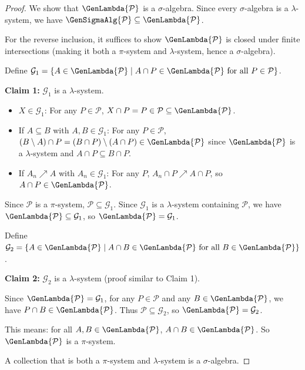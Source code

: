 \begin{proof}
We show that $\GenLambda{\mathcal{P}}$ is a $\sigma$-algebra. Since every $\sigma$-algebra is a $\lambda$-system, we have $\GenSigmaAlg{\mathcal{P}} \subseteq \GenLambda{\mathcal{P}}$.

For the reverse inclusion, it suffices to show $\GenLambda{\mathcal{P}}$ is closed under finite intersections (making it both a $\pi$-system and $\lambda$-system, hence a $\sigma$-algebra).

Define $\mathcal{G}_1 = \{A \in \GenLambda{\mathcal{P}} \mid A \cap P \in \GenLambda{\mathcal{P}} \text{ for all } P \in \mathcal{P}\}$.

\textbf{Claim 1:} $\mathcal{G}_1$ is a $\lambda$-system.
\begin{itemize}
    \item $X \in \mathcal{G}_1$: For any $P \in \mathcal{P}$, $X \cap P = P \in \mathcal{P} \subseteq \GenLambda{\mathcal{P}}$.
    \item If $A \subseteq B$ with $A, B \in \mathcal{G}_1$: For any $P \in \mathcal{P}$, $(B \setminus A) \cap P = (B \cap P) \setminus (A \cap P) \in \GenLambda{\mathcal{P}}$ since $\GenLambda{\mathcal{P}}$ is a $\lambda$-system and $A \cap P \subseteq B \cap P$.
    \item If $A_n \nearrow A$ with $A_n \in \mathcal{G}_1$: For any $P$, $A_n \cap P \nearrow A \cap P$, so $A \cap P \in \GenLambda{\mathcal{P}}$.
\end{itemize}

Since $\mathcal{P}$ is a $\pi$-system, $\mathcal{P} \subseteq \mathcal{G}_1$. Since $\mathcal{G}_1$ is a $\lambda$-system containing $\mathcal{P}$, we have $\GenLambda{\mathcal{P}} \subseteq \mathcal{G}_1$, so $\GenLambda{\mathcal{P}} = \mathcal{G}_1$.

Define $\mathcal{G}_2 = \{A \in \GenLambda{\mathcal{P}} \mid A \cap B \in \GenLambda{\mathcal{P}} \text{ for all } B \in \GenLambda{\mathcal{P}}\}$.

\textbf{Claim 2:} $\mathcal{G}_2$ is a $\lambda$-system (proof similar to Claim 1).

Since $\GenLambda{\mathcal{P}} = \mathcal{G}_1$, for any $P \in \mathcal{P}$ and any $B \in \GenLambda{\mathcal{P}}$, we have $P \cap B \in \GenLambda{\mathcal{P}}$. Thus $\mathcal{P} \subseteq \mathcal{G}_2$, so $\GenLambda{\mathcal{P}} = \mathcal{G}_2$.

This means: for all $A, B \in \GenLambda{\mathcal{P}}$, $A \cap B \in \GenLambda{\mathcal{P}}$. So $\GenLambda{\mathcal{P}}$ is a $\pi$-system.

A collection that is both a $\pi$-system and $\lambda$-system is a $\sigma$-algebra.
\end{proof}

